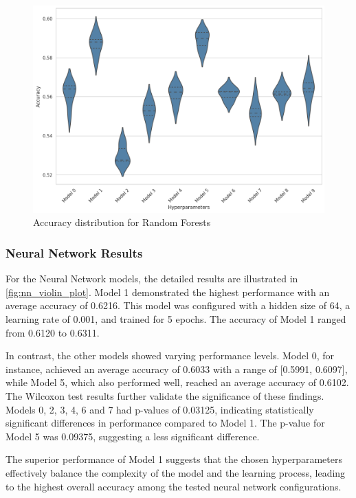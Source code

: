 \begin{figure}[H]
    \centering
    \includegraphics[width=0.99\columnwidth]{images/violin_plot_random_forest.png}
    \caption{Accuracy distribution for Random Forests}
    \label{fig:rf_violin_plot}
\end{figure}

\subsubsection{Neural Network Results}

For the Neural Network models, the detailed results 
are illustrated in \autoref{fig:nn_violin_plot}. 
Model 1 demonstrated the highest performance with 
an average accuracy of 0.6216. This model was configured 
with a hidden size of 64, a learning rate of 0.001, 
and trained for 5 epochs. The accuracy of Model 1 
ranged from 0.6120 to 0.6311.

In contrast, the other models showed varying 
performance levels. Model 0, for instance, achieved 
an average accuracy of 0.6033 with a range of 
[0.5991, 0.6097], while Model 5, which also performed 
well, reached an average accuracy of 0.6102. 
The Wilcoxon test results further validate the 
significance of these findings. 
Models 0, 2, 3, 4, 6 and 7 had p-values of 0.03125, 
indicating statistically significant differences 
in performance compared to Model 1. 
The p-value for Model 5 was 0.09375, suggesting a 
less significant difference.

The superior performance of Model 1 suggests that 
the chosen hyperparameters effectively balance the 
complexity of the model and the learning process, 
leading to the highest overall accuracy among the 
tested neural network configurations.


